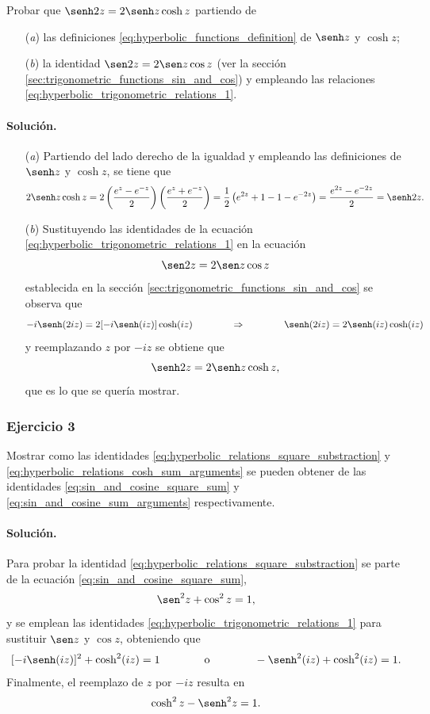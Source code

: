 \documentclass[a4paper]{report}
\begin{document}
Probar que \(\senh2z=2\senh z\cosh z\) partiendo de
\begin{enumerate}
 \item[(\textit{a})] las definiciones \ref{eq:hyperbolic_functions_definition} de \(\senh z\) y \(\cosh z\);
 \item[(\textit{b})] la identidad \(\sen2z=2\sen z\cos z\) (ver la sección \ref{sec:trigonometric_functions_sin_and_cos}) y empleando las relaciones \ref{eq:hyperbolic_trigonometric_relations_1}.
\end{enumerate}

\paragraph{Solución.} 

\begin{enumerate}
 \item[(\textit{a})] Partiendo del lado derecho de la igualdad y empleando las definiciones de \(\senh z\) y \(\cosh z\), se tiene que
 \[
  2\senh z\cosh z=2\left(\frac{e^z-e^{-z}}{2}\right)\left(\frac{e^z+e^{-z}}{2}\right)
  =\frac{1}{2}\left(e^{2z}+1-1-e^{-2z}\right)=\frac{e^{2z}-e^{-2z}}{2}=\senh2z.
 \]
 \item[(\textit{b})] Sustituyendo las identidades de la ecuación \ref{eq:hyperbolic_trigonometric_relations_1} en la ecuación
 \[
  \sen2z=2\sen z\cos z
 \]
 establecida en la sección \ref{sec:trigonometric_functions_sin_and_cos} se observa que 
 \[
  -i\senh(2iz)=2[-i\senh(iz)]\cosh(iz)
  \qquad\qquad\Rightarrow\qquad\qquad
  \senh(2iz)=2\senh(iz)\cosh(iz)
 \]
 y reemplazando \(z\) por \(-iz\) se obtiene que 
 \[
  \senh2z=2\senh z\cosh z,
 \]
 que es lo que se quería mostrar.
\end{enumerate}

\subsubsection{Ejercicio 3}

Mostrar como las identidades \ref{eq:hyperbolic_relations_square_substraction} y \ref{eq:hyperbolic_relations_cosh_sum_arguments} se pueden obtener de las identidades \ref{eq:sin_and_cosine_square_sum} y \ref{eq:sin_and_cosine_sum_arguments} respectivamente.

\paragraph{Solución.} Para probar la identidad \ref{eq:hyperbolic_relations_square_substraction} se parte de la ecuación \ref{eq:sin_and_cosine_square_sum},
\[
 \sen^2z+\cos^2z=1,
\]
y se emplean las identidades \ref{eq:hyperbolic_trigonometric_relations_1} para sustituir \(\sen z\) y \(\cos z\), obteniendo que 
\[
 [-i\senh(iz)]^2+\cosh^2(iz)=1
 \qquad\qquad\textrm{o}\qquad\qquad
 -\senh^2(iz)+\cosh^2(iz)=1.
\]
Finalmente, el reemplazo de \(z\) por \(-iz\) resulta en
\[
 \cosh^2z-\senh^2z=1.
\]
\end{document}
